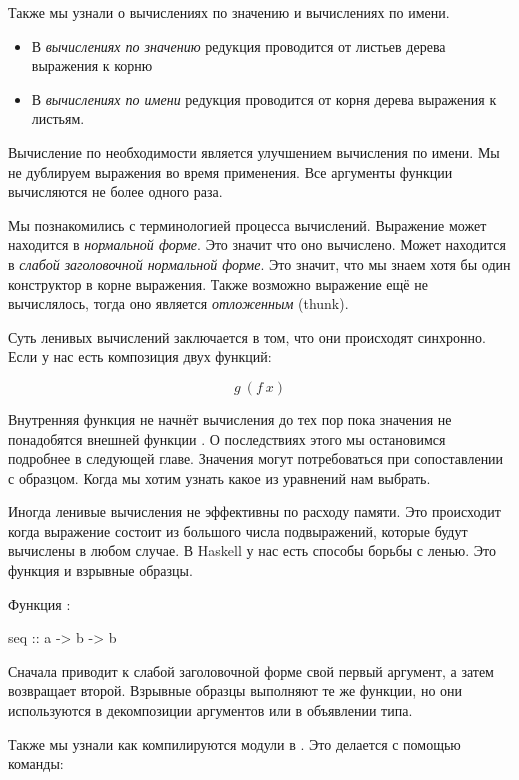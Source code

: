 Также мы узнали о вычислениях по значению и вычислениях по имени.

\begin{itemize}
\item В \emph{вычислениях по значению} редукция проводится от 
        листьев дерева выражения к корню
\item В \emph{вычислениях по имени} редукция проводится от корня 
        дерева выражения к листьям.
\end{itemize}

Вычисление по необходимости является улучшением 
вычисления по имени. Мы не дублируем выражения
во время применения. Все аргументы функции вычисляются
не более одного раза.

Мы познакомились с терминологией процесса вычислений.
Выражение может находится в \emph{нормальной форме}. Это значит
что оно вычислено. Может находится в \emph{слабой заголовочной
нормальной форме}. Это значит, что мы знаем хотя бы один 
конструктор в корне выражения. Также возможно выражение 
ещё не вычислялось, тогда оно является \emph{отложенным} (thunk).

Суть ленивых вычислений заключается в том, что они
происходят синхронно. Если у нас есть 
композиция двух функций:

\[ g\ (f\ x) \]

Внутренняя функция  не начнёт вычисления до тех
пор пока значения не понадобятся внешней функции .
О последствиях этого мы остановимся подробнее в следующей главе.
Значения могут потребоваться при сопоставлении с образцом.
Когда мы хотим узнать какое из уравнений нам выбрать.

Иногда ленивые вычисления не эффективны по расходу памяти. 
Это происходит когда выражение состоит из большого числа
подвыражений, которые будут вычислены в любом случае.
В Haskell у нас есть способы борьбы с ленью. 
Это функция  и взрывные образцы. 

Функция :

\begin{code}
seq :: a -> b -> b
\end{code}

Сначала приводит к слабой заголовочной форме свой первый
аргумент, а затем возвращает второй. Взрывные образцы
выполняют те же функции, но они используются в декомпозиции 
аргументов или в объявлении типа. 

Также мы узнали как компилируются модули в . Это делается
с помощью команды:


